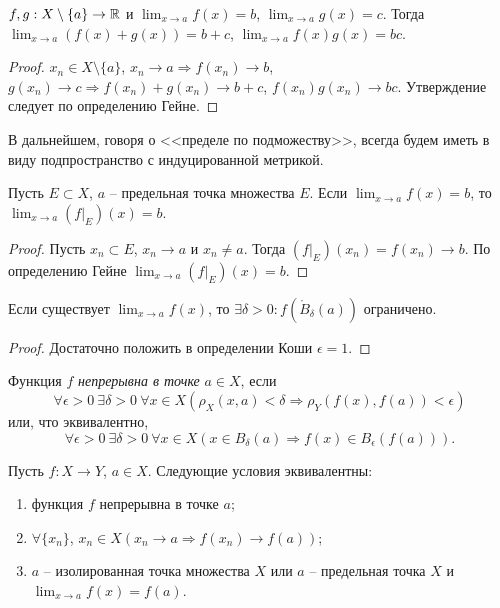 \begin{property}
    $f, g: X \setminus \{a\} \to \mathbb{R}$ и $\lim_{x \to a} f(x) = b$, $\lim_{x \to a} g(x) = c$. Тогда $\lim_{x \to a} (f(x) + g(x)) = b + c$, $\lim_{x \to a} f(x)g(x) = bc$.
\end{property}

\begin{proof}
    $x_{n} \in X \setminus \{a\}$, $x_{n} \to a \Rightarrow f(x_{n}) \to b$, $g(x_{n}) \to c \Rightarrow f(x_{n}) + g(x_{n}) \to b + c$, $f(x_{n})g(x_{n}) \to bc$. Утверждение следует по определению Гейне.
\end{proof}

В дальнейшем, говоря о <<пределе по подможеству>>, всегда будем иметь в виду подпространство с индуцированной метрикой.

\begin{property}
    \label{proper3}
    Пусть $E \subset X$, $a$ -- предельная точка множества $E$. Если $\lim_{x \to a} f(x) = b$, то $\lim_{x \to a} (f|_{E})(x) = b$.
\end{property}

\begin{proof}
    Пусть $x_{n} \subset E$, $x_{n} \to a$ и $x_{n} \neq a$. Тогда $(f|_{E})(x_{n}) = f(x_{n}) \to b$. По определению Гейне $\lim_{x \to a}(f|_{E})(x) = b$.
\end{proof}

\begin{property}
    Если существует $\lim_{x \to a} f(x)$, то $\exists \delta > 0: f(\mathring{B}_{\delta}(a))$ ограничено.
\end{property}

\begin{proof}
    Достаточно положить в определении Коши $\epsilon = 1$.
\end{proof}

\begin{definition}
    Функция $f$ \textit{непрерывна в точке} $a \in X$, если
    \[\forall \epsilon > 0 \ \exists \delta > 0 \ \forall x \in X \left(\rho_{X}(x, a) < \delta \Rightarrow \rho_{Y}(f(x), f(a)) < \epsilon\right)\]
    или, что эквивалентно,
    \[\forall \epsilon > 0 \ \exists \delta > 0 \ \forall x \in X \left(x \in B_{\delta}(a) \Rightarrow f(x) \in B_{\epsilon}(f(a))\right).\]
\end{definition}

\begin{lemma}
    Пусть $f: X \to Y$, $a \in X$. Следующие условия эквивалентны:
    \begin{enumerate}
        \item функция $f$ непрерывна в точке $a$;
        \item $\forall \{x_{n}\}$, $x_{n} \in X \left(x_{n} \to a \Rightarrow f(x_{n}) \to f(a)\right)$;
        \item $a$ -- изолированная точка множества $X$ или $a$ -- предельная точка $X$ и $\lim_{x \to a} f(x) = f(a)$.
    \end{enumerate}
\end{lemma}

